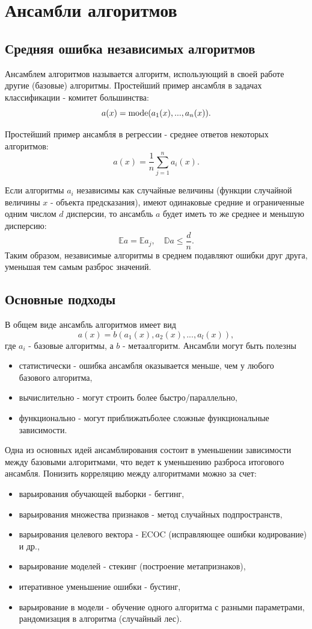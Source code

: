 \section{Ансамбли алгоритмов}

\subsection{Средняя ошибка независимых алгоритмов}

Ансамблем алгоритмов называется алгоритм, использующий в своей работе другие (базовые) алгоритмы.
Простейший пример ансамбля в задачах классификации - комитет большинства:
$$
a(x) = \operatorname*{mode}(a_1(x), ..., a_n(x)).
$$

Простейший пример ансамбля в регрессии - среднее ответов некоторых алгоритмов:
$$
a(x) = \frac{1}{n}\sum_{j=1}^na_i(x).
$$

Если алгоритмы $a_i$ независимы как случайные величины (функции случайной величины $x$ - объекта предсказания), имеют одинаковые средние и ограниченные одним числом $d$ дисперсии, то ансамбль $a$ будет иметь то же среднее и меньшую дисперсию:
$$
\mathbb{E}a = \mathbb{E}a_j, \quad \mathbb{D}a \leqslant \frac{d}{n}.
$$
Таким образом, независимые алгоритмы в среднем подавляют ошибки друг друга, уменьшая тем самым разброс значений.


\subsection{Основные подходы}

В общем виде ансамбль алгоритмов имеет вид
$$
a(x) = b(a_1(x), a_2(x), ..., a_l(x)),
$$
где $a_i$ - базовые алгоритмы, а $b$ - метаалгоритм. Ансамбли могут быть полезны
\begin{itemize}
    \item статистически - ошибка ансамбля оказывается меньше, чем у любого базового алгоритма,
    \item вычислительно - могут строить более быстро/параллельно,
    \item функционально - могут приближатьболее сложные функциональные зависимости.
\end{itemize}

Одна из основных идей ансамблирования состоит в уменьшении зависимости между базовыми алгоритмами, что ведет к уменьшению разброса итогового ансамбля.
Понизить корреляцию между алгоритмами можно за счет:
\begin{itemize}
    \item варьирования обучающей выборки - беггинг,
    \item варьирования множества признаков - метод случайных подпространств,
    \item варьирования целевого вектора - ECOC (исправляющее ошибки кодирование) и др.,
    \item варьирование моделей - стекинг (построение метапризнаков),
    \item итеративное уменьшение ошибки - бустинг,
    \item варьирование в модели - обучение одного алгоритма с разными параметрами, рандомизация в алгоритма (случайный лес).
\end{itemize} 

